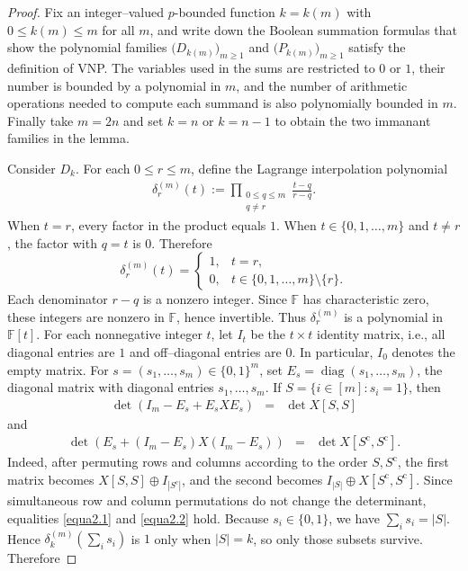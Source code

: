 \documentclass[11pt,a4paper]{article}
\begin{document}
\begin{proof}
Fix an integer–valued $p$-bounded function $k=k(m)$ with $0\leq k(m)\leq m$ for all $m$, and write down the Boolean summation formulas that show the polynomial families
$\bigl(D_{k(m)}\bigr)_{m\geq1}$ and $\bigl(P_{k(m)}\bigr)_{m\geq1}$ satisfy the definition of VNP. The variables used in the sums are restricted to $0$ or $1$, their number is bounded by a polynomial in $m$, and the number of arithmetic operations needed to compute each summand is also polynomially bounded in $m$. Finally take $m=2n$ and set $k=n$ or $k=n-1$ to obtain the two immanant families in the lemma.

Consider $D_k$. For each $0\leq r\leq m$, define the Lagrange interpolation polynomial
\begin{eqnarray*}
  \delta_r^{(m)}(t)
  :=\prod_{\substack{0\leq q\leq m\\q\ne r}}
    \frac{t-q}{r-q}.
\end{eqnarray*}
When $t=r$, every factor in the product equals $1$. When $t\in\{0,1,\ldots,m\}$ and $t\ne r$, the factor with $q=t$ is $0$. Therefore
\[
  \delta_r^{(m)}(t)=
  \begin{cases}
    1,&t=r,\\
    0,&t\in\{0,1,\ldots,m\}\setminus\{r\}.
  \end{cases}
\]
Each denominator $r-q$ is a nonzero integer. Since $\mathbb{F}$ has characteristic zero, these integers are nonzero in $\mathbb{F}$, hence invertible. Thus $\delta_r^{(m)}$ is a polynomial in $\mathbb{F}[t]$.
For each nonnegative integer $t$, let $I_t$ be the $t\times t$ identity matrix, i.e., all diagonal entries are $1$ and off–diagonal entries are $0$. In particular, $I_0$ denotes the empty matrix.
For $s=(s_1,\ldots,s_m)\in\{0,1\}^m$, set $E_s=\operatorname{diag}(s_1,\ldots,s_m)$, the diagonal matrix with diagonal entries $s_1,\ldots,s_m$. If $S=\{i\in[m]:s_i=1\}$, then
\begin{eqnarray}\label{equa2.1}
  \operatorname{det}(I_m-E_s+E_sXE_s)&=&\operatorname{det} X[S,S]
  \end{eqnarray}
  and
  \begin{eqnarray}\label{equa2.2}
  \operatorname{det}(E_s+(I_m-E_s)X(I_m-E_s))&=&\operatorname{det} X[S^{\mathrm{c}},S^{\mathrm{c}}].
\end{eqnarray}
Indeed, after permuting rows and columns according to the order $S,S^{\mathrm{c}}$, the first matrix becomes $X[S,S]\oplus I_{|S^{\mathrm{c}}|}$, and the second becomes $I_{|S|}\oplus X[S^{\mathrm{c}},S^{\mathrm{c}}]$. Since simultaneous row and column permutations do not change the determinant, equalities \eqref{equa2.1} and \eqref{equa2.2} hold. Because $s_i\in\{0,1\}$, we have $\sum_i s_i=|S|$. Hence $\delta_k^{(m)}(\sum_i s_i)$ is $1$ only when $|S|=k$, so only those subsets survive. Therefore

\end{proof}
\end{document}
